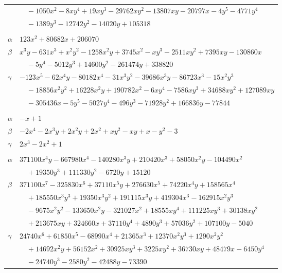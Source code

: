 \documentclass[11pt]{article}
\begin{document}
\begin{longtable}{@{}ll@{}}
 & $\quad -1050x^{2}-8xy^{4}+19xy^{3}-29762xy^{2}-13807xy-20797x-4y^{5}-4771y^{4}$\\
 & $\quad -1389y^{3}-12742y^{2}-14020y+105318$\\
\addlinespace[3pt]
\multicolumn{2}{@{}l}{$\{i,j\}=\{15,205\}$, $k_{ij}=2\cdot 3^{6}\cdot 31^{2}$}\\
$\alpha$ & $123x^{2}+80682x+206070$\\
$\beta$ & $x^{3}y-631x^{3}+x^{2}y^{2}-1258x^{2}y+3745x^{2}-xy^{3}-2511xy^{2}+7395xy-130860x$\\
 & $\quad -5y^{4}-5012y^{3}+14600y^{2}-261474y+338820$\\
$\gamma$ & $-123x^{5}-62x^{4}y-80182x^{4}-31x^{3}y^{2}-39686x^{3}y-86723x^{3}-15x^{2}y^{3}$\\
 & $\quad -18856x^{2}y^{2}+16228x^{2}y+190782x^{2}-6xy^{4}-7586xy^{3}+34688xy^{2}+127089xy$\\
 & $\quad -305436x-5y^{5}-5027y^{4}-496y^{3}-71928y^{2}+166836y-77844$\\
\addlinespace[3pt]
\multicolumn{2}{@{}l}{$\{i,j\}=\{16,70\}$, $k_{ij}=1$}\\
$\alpha$ & $-x+1$\\
$\beta$ & $-2x^{4}-2x^{3}y+2x^{2}y+2x^{2}+xy^{2}-xy+x-y^{2}-3$\\
$\gamma$ & $2x^{3}-2x^{2}+1$\\
\addlinespace[3pt]
\multicolumn{2}{@{}l}{$\{i,j\}=\{17,18\}$, $k_{ij}=2^{4}\cdot 3^{4}\cdot 5\cdot 7$}\\
$\alpha$ & $371100x^{4}y-667980x^{4}-140280x^{3}y+210420x^{3}+58050x^{2}y-104490x^{2}$\\
 & $\quad +19350y^{3}+111330y^{2}-6720y+15120$\\
$\beta$ & $371100x^{7}-325830x^{6}+37110x^{5}y+276630x^{5}+74220x^{4}y+158565x^{4}$\\
 & $\quad +185550x^{3}y^{3}+19350x^{3}y^{2}+191115x^{3}y+419304x^{3}-162915x^{2}y^{3}$\\
 & $\quad -9675x^{2}y^{2}-133650x^{2}y-321027x^{2}+18555xy^{4}+111225xy^{3}+30138xy^{2}$\\
 & $\quad +213675xy+324660x+37110y^{4}+4890y^{3}+57036y^{2}+107100y-5040$\\
$\gamma$ & $24740x^{6}+61850x^{5}-68990x^{4}+21365x^{3}+12370x^{2}y^{3}+1290x^{2}y^{2}$\\
 & $\quad +14692x^{2}y+56152x^{2}+30925xy^{3}+3225xy^{2}+36730xy+48479x-6450y^{4}$\\
 & $\quad -24740y^{3}-2580y^{2}-42488y-73390$\\

\end{longtable}
\end{document}
